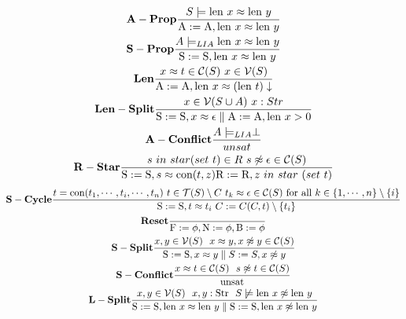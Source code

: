 \documentclass[14pt]{article}
\begin{document}
\scriptsize	
  \begin{gather*}\label{eA1}
   \bold{A-Prop} \frac{ S \models  \textnormal{len} \ x \approx \textnormal{len} \ y}{ \textnormal{A} := \textnormal{A}, \textnormal{len} \ x \approx \textnormal{len} \ y}\\
    \bold{S-Prop} \frac{ A \models_{LIA}  \textnormal{len} \ x \approx \textnormal{len} \ y}{ \textnormal{S} := \textnormal{S}, \textnormal{len} \ x \approx \textnormal{len} \ y}\\
   \bold{Len} \frac{ x \approx t \in \mathcal{C}(S) \ x \in \mathcal{V}(S)}{ \textnormal{A} := \textnormal{A}, \textnormal{len} \ x \approx (\textnormal{len} \ t) \downarrow}\\
   \bold{Len-Split} \frac{ x \in \mathcal{V}(S \cup A) \ x: Str}{ \textnormal{S} := \textnormal{S}, x \approx \epsilon \parallel  \textnormal{A}:= \textnormal{A}, \textnormal{len} \ x > 0}\\
   \bold{A-Conflict} \frac{ A \models_{LIA} \perp }{ unsat}\\
   \bold{R-Star} \frac{ s \ in \ star( set \ t) \in R \ s  \not\approx \epsilon \in \mathcal{C}(S)}{ \textnormal{S}:= \textnormal{S}, s \approx \textnormal{con}(t,z) \textnormal{R}:= \textnormal{R}, z \ in \ star \ (set \ t)}
  \end{gather*}
  \begin{gather*}\label{eA1}
   \bold{S-Cycle} \frac
   { t = \textnormal{con}(t_1, \cdots, t_i, \cdots, t_n) \ t \in \mathcal{T}(S) \setminus C \ t_k \approx \epsilon \in \mathcal{C}(S) \ \textnormal{for all} \ k \in \{1,\cdots,n\} \setminus \{ i \} }
   { \textnormal{S} := \textnormal{S}, t \approx t_i \ C:=C (C, t) \setminus \{t_i\}   }\\
    \bold{Reset} \frac{ }
    { \textnormal{F} := \phi, \textnormal{N} := \phi, \textnormal{B} := \phi}\\
     \bold{S-Split} \frac
     { x, y \in \mathcal{V}(S) \ \ x \approx y, x \not\approx y \in \mathcal{C}(S) }
     { \textnormal{S} := \textnormal{S}, x \approx y \parallel S:= S, x \not\approx y}\\
        \bold{S-Conflict} \frac
        { x \approx t \in \mathcal{C}(S) \ \ s \not\approx t \in \mathcal{C}(S)}
        { \textnormal{unsat}}\\
        \bold{L-Split} \frac
         { x, y \in \mathcal{V}(S) \ \ x,y: \textnormal{Str}  \ \  S \not\models \textnormal{len} \ x \not\approx \textnormal{len} \ y}
         { \textnormal{S}:= \textnormal{S}, \textnormal{len} \ x \approx \textnormal{len} \ y \parallel \textnormal{S}:=\textnormal{S}, \textnormal{len} \ x \not\approx \textnormal{len} \ y}
  \end{gather*}
\end{document}
